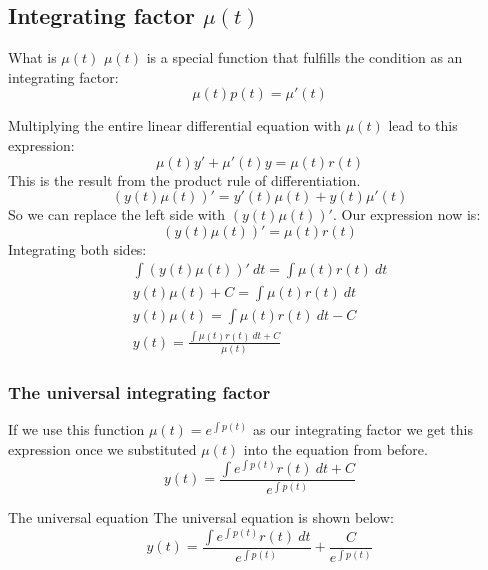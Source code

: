 \documentclass[letterpaper,10pt,twoside,twocolumn,openany]{book}
\begin{document}
\subsection{Integrating factor $\mu(t)$}
\begin{DndSidebar}{What is $\mu(t)$}
    $ \mu(t) $ is a special function that fulfills the condition as an integrating factor:
    \begin{equation}
        \mu(t) p(t) = \mu'(t)
    \end{equation}
\end{DndSidebar}
Multiplying the entire linear differential equation with $ \mu(t) $ lead to this expression:
$$
    \mu(t)y' + \mu'(t)y = \mu(t)r(t)
$$
This is the result from the product rule of differentiation.
$$
    (y(t)\mu(t))' = y'(t)\mu(t) + y(t)\mu'(t)
$$
So we can replace the left side with $ (y(t)\mu(t))' $. Our expression now is:
$$
    (y(t)\mu(t))' = \mu(t)r(t)
$$
Integrating both sides:
\begin{gather*}   
    \int (y(t)\mu(t))'\ dt = \int \mu(t)r(t)\ dt\\
    y(t)\mu(t) + C = \int \mu(t)r(t)\ dt\\
    y(t)\mu(t) = \int \mu(t)r(t)\ dt - C\\
    y(t) = \frac{\int \mu(t)r(t)\ dt + C}{\mu(t)}
\end{gather*}

\subsubsection{The universal integrating factor}
If we use this function
$
    \mu(t) = e^{\int p(t)}
$
as our integrating factor we get this expression once we substituted $ \mu(t) $ into the equation from before.\\
\begin{equation*}
    y(t) = \frac{\int e^{\int p(t)} r(t)\ dt + C}{e^{\int p(t)}}
\end{equation*}
\begin{DndSidebar}{The universal equation}
    The universal equation is shown below:
    \begin{equation}
        y(t) = \frac{\int e^{\int p(t)} r(t)\ dt}{e^{\int p(t)}} + \frac{C}{e^{\int p(t)}}
    \end{equation}
\end{DndSidebar}
\end{document}
